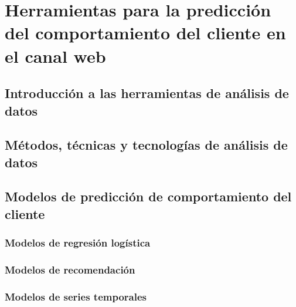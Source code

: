 \documentclass[letterpaper, 12pt]{report}
\begin{document}
\section{Herramientas para la predicción del comportamiento del cliente en el canal web}

\subsection{Introducción a las herramientas de análisis de datos}


\subsection{Métodos, técnicas y tecnologías de análisis de datos}


\subsection{Modelos de predicción de comportamiento del cliente}


\subsubsection{Modelos de regresión logística}



\subsubsection{Modelos de recomendación}



\subsubsection{Modelos de series temporales}

\end{document}
